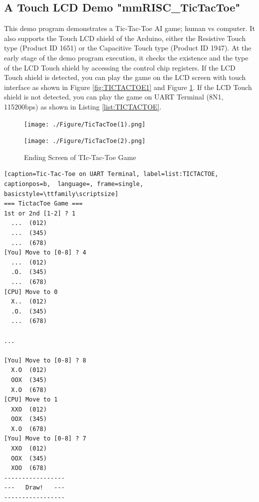 \subsection{A Touch LCD Demo "mmRISC\_TicTacToe"}
This demo program demonstrates a Tic-Tac-Toe AI game; human vs computer. It also supports the Touch LCD shield of the Arduino, either the Resistive Touch type (Product ID 1651) or the Capacitive Touch type (Product ID 1947). At the early stage of the demo program execution, it checks the existence and the type of the LCD Touch shield by accessing the control chip registers. If the LCD Touch shield is detected, you can play the game on the LCD screen with touch interface as shown in Figure \ref{fig:TICTACTOE1} and Figure \ref{fig:TICTACTOE2}. If the LCD Touch shield is not detected, you can play the game on UART Terminal (8N1, 115200bps) as shown in Listing \ref{list:TICTACTOE}.

\begin{figure}[H]
	\begin{minipage}[t]{0.5\columnwidth}
		\begin{center}
            \texttt{[image: ./Figure/TicTacToe(1).png]}
		\end{center}
		\caption{Startup Screen of TIc-Tac-Toe Game}
		\label{fig:TICTACTOE1}
	\end{minipage}%
	\begin{minipage}[t]{0.5\columnwidth}
		\begin{center}
            \texttt{[image: ./Figure/TicTacToe(2).png]}
		\end{center}
		\caption{Ending Screen of TIc-Tac-Toe Game}
		\label{fig:TICTACTOE2}
	\end{minipage}
\end{figure}

\begin{lstlisting}[caption=Tic-Tac-Toe on UART Terminal, label=list:TICTACTOE, captionpos=b,  language=, frame=single, basicstyle=\ttfamily\scriptsize]
=== TictacToe Game ===
1st or 2nd [1-2] ? 1
  ...  (012)
  ...  (345)
  ...  (678)
[You] Move to [0-8] ? 4
  ...  (012)
  .O.  (345)
  ...  (678)
[CPU] Move to 0
  X..  (012)
  .O.  (345)
  ...  (678)

...

[You] Move to [0-8] ? 8
  X.O  (012)
  OOX  (345)
  X.O  (678)
[CPU] Move to 1
  XXO  (012)
  OOX  (345)
  X.O  (678)
[You] Move to [0-8] ? 7
  XXO  (012)
  OOX  (345)
  XOO  (678)
-----------------
---   Draw!   ---
-----------------
\end{lstlisting}




